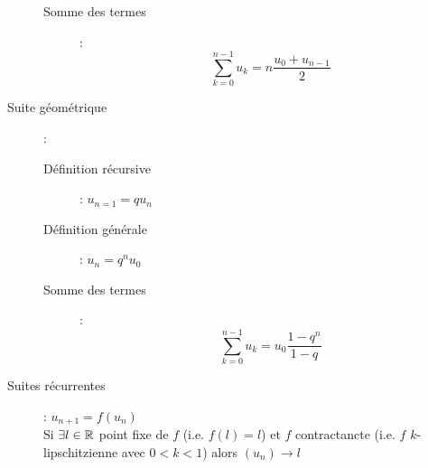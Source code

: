 \begin{description}
\begin{description}
    \item[Somme des termes] : \[
        \sum_{k=0}^{n-1}u_k=n\frac{u_0+u_{n-1}}{2}
    \]
    \end{description}
\item[Suite géométrique] : 
    \begin{description}
    \item[Définition récursive] : $u_{n=1}=qu_n$
    \item[Définition générale] : $u_n=q^nu_0$
    \item[Somme des termes] : \[
        \sum_{k=0}^{n-1}u_k=u_0\frac{1-q^n}{1-q}
    \]
    \end{description}
\item[Suites récurrentes] : $u_{n+1}=f(u_n)$\\
    Si $\exists l\in\mathbb{R}$ point fixe de $f$ (i.e. $f(l)=l$) et $f$ contractancte (i.e. $f$ $k$-lipschitzienne avec $0<k<1$) alors
    $(u_n)\longrightarrow l$
\end{description}